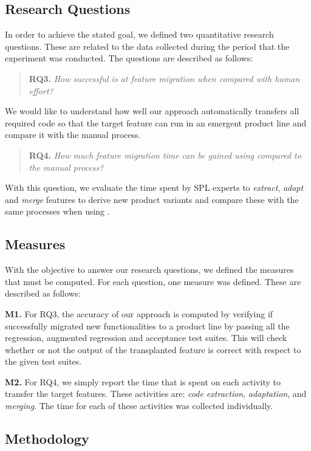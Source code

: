 \subsection{Research Questions}

In order to achieve the stated goal, we defined two quantitative research questions. These are related to the data collected during the period that the experiment was conducted. The questions are described as follows:

\begin{quote}
\textbf{RQ3.} \emph{How successful is \prodscalpel at feature migration when compared with human effort?}
\end{quote}
We would like to understand how well our approach automatically transfers all required code so that the target feature can run in an emergent product line and compare it with the manual process.

\begin{quote}
\textbf{RQ4.} \emph{How much feature migration time can be gained using \prodscalpel compared to the manual process?} 
\end{quote}
With this question, we evaluate the time spent by SPL experts to \emph{extract}, \emph{adapt} and \emph{merge} features to derive new product variants and compare these with the same processes when using \prodscalpel. 

\subsection{Measures}
With the objective to answer our research questions, we defined the measures that must be computed. For each question, one measure was defined. These are described as follows:

\textbf{M1.} For RQ3, the accuracy of our approach is computed by verifying if \prodscalpel successfully migrated new functionalities to a product line by passing all the regression, augmented regression and acceptance test suites. This will check whether or not the output of the transplanted feature is correct with respect to the given test suites. 

\textbf{M2.} For RQ4, we simply report the time that is spent on each activity to transfer the target features. These activities are: \emph{code extraction}, \emph{adaptation}, and \emph{merging}. The time for each of these activities was collected individually.

\subsection{Methodology}

